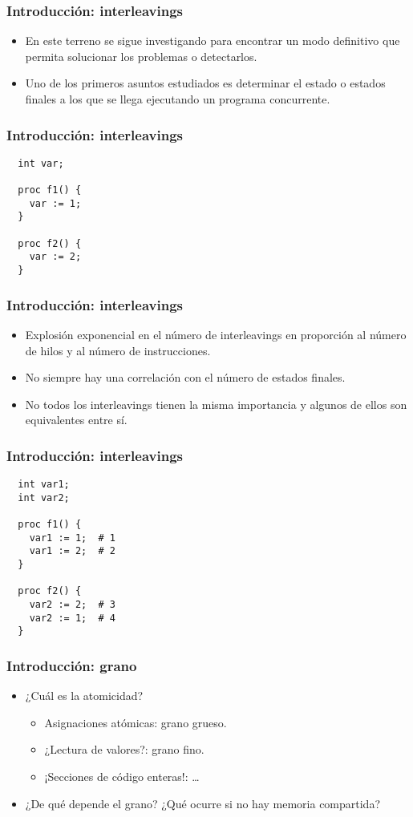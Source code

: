 \documentclass[spanish, a4paper, 12pt, final, slideColor, nototal, colorBG, pdf, noaccumulate, darkblue] {beamer}
\begin{document}
\begin{frame}
  \frametitle{Introducción: interleavings}
  \begin{itemize}
    \item En este terreno se sigue investigando para encontrar un modo definitivo que permita solucionar los problemas o detectarlos.
    \item Uno de los primeros asuntos estudiados es determinar el estado o estados finales a los que se llega ejecutando un programa concurrente.
  \end{itemize}
\end{frame}

\begin{frame}[fragile]
  \frametitle{Introducción: interleavings}
  \begin{lstlisting}
  int var;

  proc f1() {
    var := 1;
  }

  proc f2() {
    var := 2;
  }
  \end{lstlisting}
\end{frame}

\begin{frame}
  \frametitle{Introducción: interleavings}
  \begin{itemize}
  \item Explosión exponencial en el número de interleavings en proporción al número de hilos y al número de instrucciones.
  \item No siempre hay una correlación con el número de estados finales.
  \item No todos los interleavings tienen la misma importancia y algunos de ellos son equivalentes entre sí.
  \end{itemize}
\end{frame}

\begin{frame}[fragile]
  \frametitle{Introducción: interleavings}
  \begin{lstlisting}
  int var1;
  int var2;

  proc f1() {
    var1 := 1;  # 1
    var1 := 2;  # 2
  }

  proc f2() {
    var2 := 2;  # 3
    var2 := 1;  # 4
  }
  \end{lstlisting}
\end{frame}

\begin{frame}
  \frametitle{Introducción: grano}
  \begin{itemize}
  \item ¿Cuál es la atomicidad?
    \begin{itemize}
    \item Asignaciones atómicas: grano grueso.
    \item ¿Lectura de valores?: grano fino.
    \item ¡Secciones de código enteras!: \dots
    \end{itemize}
  \item ¿De qué depende el grano? ¿Qué ocurre si no hay memoria compartida?
  \end{itemize}
\end{frame}
\end{document}
